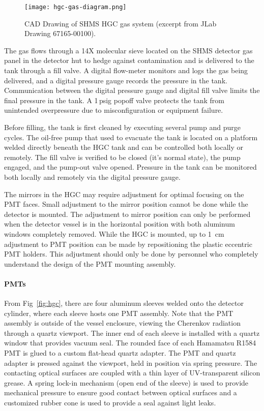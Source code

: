 {\begin{figure}[ht]
\centering
\texttt{[image: hgc-gas-diagram.png]}
\caption{CAD Drawing of SHMS HGC gas system (excerpt from JLab Drawing 67165-00100).}
\label{fig:hgc-gas-system}
\end{figure}

The gas flows through a 14X molecular sieve located on the SHMS detector gas
panel in the detector hut to hedge against contamination and is delivered to
the tank through a fill valve.  A digital flow-meter monitors and logs the gas
being delivered, and a digital pressure gauge records the pressure in the tank.
Communication between the digital pressure gauge and digital fill valve limits
the final pressure in the tank.  A 1\,psig popoff valve protects the tank from
unintended overpressure due to misconfiguration or equipment failure.

Before filling, the tank is first cleaned by executing several pump and purge
cycles. The oil-free pump that used to evacuate the tank is located on a
platform welded directly beneath the HGC tank and can be controlled both
locally or remotely.  The fill valve is verified to be closed (it's normal
state), the pump engaged, and the pump-out valve opened.  Pressure in the tank
can be monitored both locally and remotely via the digital pressure gauge.

The mirrors in the HGC may require adjustment for optimal focusing on the PMT
faces. Small adjustment to the mirror position cannot be done while the
detector is mounted. The adjustment to mirror position can only be performed
when the detector vessel is in the horizontal position with both aluminum
windows completely removed. While the HGC is mounted, up to 1~cm adjustment to
PMT position can be made by repositioning the plastic eccentric PMT holders.
This adjustment should only be done by personnel who completely understand the
design of the PMT mounting assembly. 


\paragraph{PMTs} From Fig~\ref{fig:hgc}, there are four aluminum sleeves welded onto
the detector cylinder, where each sleeve hosts one PMT assembly. Note
that the PMT assembly is outside of the vessel enclosure, viewing
the Cherenkov radiation through a quartz viewport. The inner end of
each sleeve is installed with a quartz window that provides vacuum
seal.  The rounded face of each Hamamatsu R1584 PMT is glued to a custom
flat-head quartz adapter. The PMT and quartz adapter is pressed
against the viewport, held in position via spring pressure. The
contacting optical surfaces are coupled with a thin layer of
UV-transparent silicon grease. A spring lock-in mechanism (open end of
the sleeve) is used to provide mechanical pressure to ensure good
contact between optical surfaces and a customized rubber cone is used
to provide a seal against light leaks.

}

